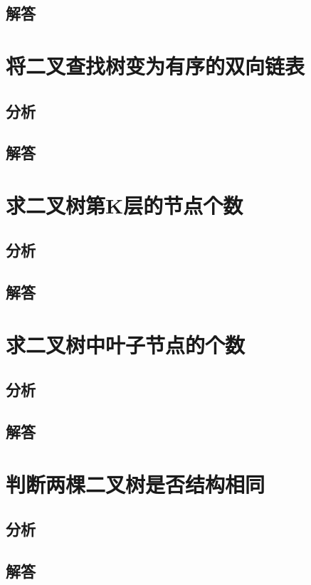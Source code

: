 \documentclass[UTF8,a4paper,12pt]{ctexbook}
\begin{document}
	\subsection{解答}
	
\section{将二叉查找树变为有序的双向链表}
	\subsection{分析}
	
	\subsection{解答}
	
\section{求二叉树第K层的节点个数}
	\subsection{分析}
	
	\subsection{解答}
	
	
\section{求二叉树中叶子节点的个数}
	\subsection{分析}
	
	\subsection{解答}
	
\section{判断两棵二叉树是否结构相同}
	\subsection{分析}
	
	\subsection{解答}
\end{document}
